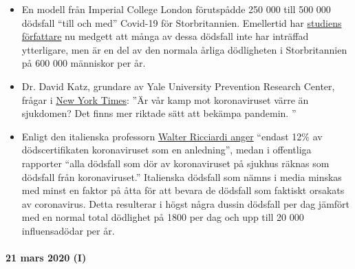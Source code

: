 \begin{itemize}
\tightlist
\item
  En modell från Imperial College London förutspådde 250 000 till 500
  000 dödsfall ``till och med'' Covid-19 för Storbritannien. Emellertid
  har \href{https://www.bbc.com/news/health-51979654}{studiens
  författare} nu medgett att många av dessa dödsfall inte har inträffad
  ytterligare, men är en del av den normala årliga dödligheten i
  Storbritannien på 600 000 människor per år.
\item
  Dr. David Katz, grundare av Yale University Prevention Research
  Center, frågar i
  \href{https://www.nytimes.com/2020/03/20/opinion/coronavirus-pandemic-social-distancing.html}{New
  York Times}: ''Är vår kamp mot koronaviruset värre än sjukdomen? Det
  finns mer riktade sätt att bekämpa pandemin. ''
\item
  Enligt den italienska professorn
  \href{https://web.archive.org/web/20200324214448/https://www.telegraph.co.uk/global-health/science-and-disease/have-many-coronavirus-patients-died-italy/}{Walter
  Ricciardi anger} ``endast 12\% av dödscertifikaten koronaviruset som
  en anledning'', medan i offentliga rapporter ``alla dödsfall som dör
  av koronaviruset på sjukhus räknas som dödsfall från koronaviruset.''
  Italienska dödsfall som nämns i media minskas med minst en faktor på
  åtta för att bevara de dödsfall som faktiskt orsakats av coronavirus.
  Detta resulterar i högst några dussin dödsfall per dag jämfört med en
  normal total dödlighet på 1800 per dag och upp till 20 000
  influensadödar per år.
\end{itemize}

\hypertarget{21-mars-2020-i}{%
\paragraph{21 mars 2020 (I)}\label{21-mars-2020-i}}

